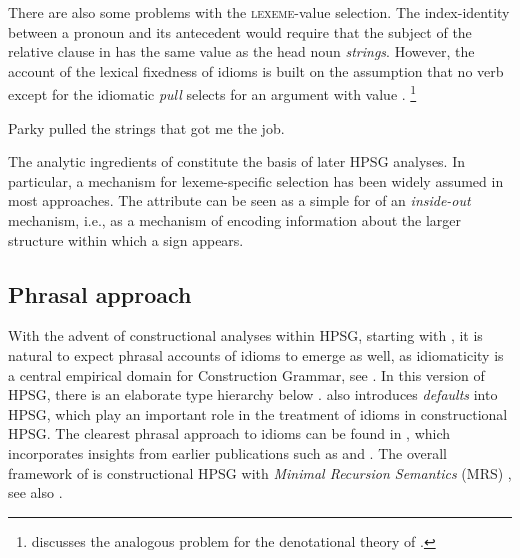 \documentclass[output=paper]{langsci/langscibook}
\begin{document}
There are also some problems with the \textsc{lexeme}-value selection. The index-identity between a pronoun and its antecedent would require that the subject of the relative clause in  has the same  value as the head noun \emph{strings}. However, the account of the lexical fixedness of idioms is built on the assumption that no verb except for the idiomatic \emph{pull} selects for an argument with  value .%
\footnote{\cite{Pulman:93} discusses the analogous problem for the denotational theory of \cite{GKPS85a}.}

\ea \label{strings-relcl}
Parky pulled the strings that got me the job.
\citep[137]{McCawley:81}
\z 

The analytic ingredients of \cite{KE94a} constitute the basis of later HPSG analyses. In particular, a mechanism for lexeme-specific selection has been widely assumed in most approaches. The attribute  can be seen as a simple for of an \emph{inside-out} mechanism, i.e., as a mechanism of encoding information about the larger structure within which a sign appears. 


\subsection{Phrasal approach}
\label{Sec-Phrasal}

With the advent of constructional analyses within HPSG, starting with \cite{Sag97a}, it is natural to expect phrasal accounts of idioms to emerge as well, as idiomaticity is a central empirical domain for Construction Grammar, see . 
In this version of HPSG, there is an elaborate type hierarchy below . 
\cite{Sag97a} also introduces \emph{defaults} into HPSG, which play an important role in the treatment of idioms in constructional HPSG.
The clearest phrasal approach to idioms can be found in \cite{Riehemann2001a}, which incorporates insights from earlier publications such as \cite{Riehemann97a} and \cite{RB99a}.
%
The overall framework of \cite{Riehemann2001a} is constructional HPSG with \emph{Minimal Recursion Semantics} (MRS) \citep{CFMRS95a-u,CFPS2005a}, see also .
\end{document}
